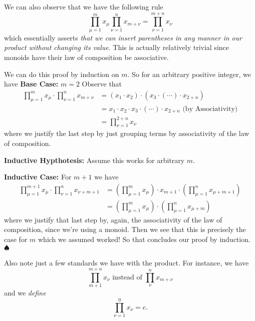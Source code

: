 We can also observe that we have the following rule
\begin{equation}
\prod^{m}_{\mu=1}x_{\mu}\prod^{n}_{\nu=1}x_{m+\nu}=\prod^{m+n}_{\nu=1}x_{\nu}
\end{equation}
which essentially asserts \emph{that we can insert
  parentheses in any manner in our product without changing
  its value}. This is actually relatively trivial since
monoids have their law of composition be associative.
\begin{sketch}
We can do this proof by induction on $m$. So for an
arbitrary positive integer, we have
\textbf{Base Case:} $m=2$ Observe that
\begin{subequations}
\begin{align}
\prod^{m}_{\mu=1}x_{\mu}\cdot\prod^{n}_{\nu=1}x_{m+\nu}
&= (x_1\cdot x_2)\cdot(x_3\cdot(\cdots)\cdot x_{2+n})\\
&= x_1\cdot x_2 \cdot x_3 \cdot (\cdots)\cdot x_{2+n}\text{ (by Associativity)}\\
&= \prod^{2+n}_{\nu=1}x_{\nu}
\end{align}
\end{subequations}
where we justify the last step by just grouping terms by
associativity of the law of composition.

\textbf{Inductive Hypthotesis:} Assume this works for
arbitrary $m$.

\textbf{Inductive Case:} For $m+1$ we have
\begin{subequations}
\begin{align}
\prod^{m+1}_{\mu=1}x_{\mu}\cdot\prod^{n}_{\nu=1}x_{\nu+m+1} &= 
\left(\prod^{m}_{\mu=1}x_{\mu}\right)\cdot x_{m+1}\cdot\left(\prod^{n}_{\mu=1}x_{\mu+m+1}\right)\\
&= \left(\prod^{m}_{\mu=1}x_{\mu}\right)\cdot\left(\prod^{n}_{\mu=1}x_{\mu+m}\right)
\end{align}
\end{subequations}
where we justify that last step by, again, the associativity
of the law of composition, since we're using a monoid. Then
we see that this is precisely the case for $m$ which we
assumed worked! So that concludes our proof by induction. $\spadesuit$
\end{sketch}

Also note just a few standards we have with the product. For
instance, we have
\begin{equation}
\prod^{m+n}_{m+1}x_{\nu}\text{  instead of  }
\prod^{n}_{\nu}x_{m+\nu}
\end{equation}
and we \emph{define}
\begin{equation}
\prod^{0}_{\nu=1}x_\nu = e.
\end{equation}

